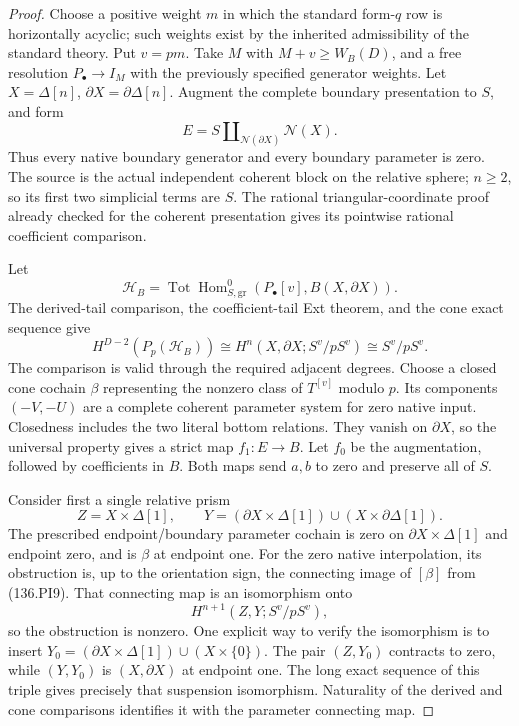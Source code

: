 \begin{proof}
Choose a positive weight \(m\) in which the standard form-\(q\)
row is horizontally acyclic; such weights exist by the inherited
admissibility of the standard theory.  Put \(v=pm\).
Take \(M\) with \(M+v\geq W_B(D)\), and a free resolution
\(P_\bullet\to I_M\) with the previously specified generator
weights.  Let \(X=\Delta[n]\), \(\partial X=\partial\Delta[n]\).
Augment the complete boundary presentation to \(S\), and form
\[
                  E=S\amalg_{\mathcal N(\partial X)}
                                             \mathcal N(X).
                                                               \tag{136.PI8}
\]
Thus every native boundary generator and every boundary parameter
is zero.  The source is the actual independent coherent block
on the relative sphere; \(n\geq2\), so its first two simplicial
terms are \(S\).  The rational triangular-coordinate proof
already checked for the coherent presentation gives its pointwise
rational coefficient comparison.

Let
\[
 \mathcal H_B=\operatorname{Tot}
       \operatorname{Hom}^{0}_{S,\mathrm{gr}}
                    (P_\bullet[v],B(X,\partial X)).
\]
The derived-tail comparison, the coefficient-tail Ext theorem,
and the cone exact sequence give
\[
 H^{D-2}(P_p(\mathcal H_B))
       \cong H^n(X,\partial X;S^v/pS^v)
       \cong S^v/pS^v.
                                                               \tag{136.PI9}
\]
The comparison is valid through the required adjacent degrees.
Choose a closed cone cochain \(\beta\) representing the
nonzero class of \(T^{[v]}\) modulo \(p\).  Its components
\((-V,-U)\) are a complete coherent parameter system for zero
native input.  Closedness includes the two literal bottom
relations.  They vanish on \(\partial X\), so the universal
property gives a strict map \(f_1:E\to B\).  Let \(f_0\)
be the augmentation, followed by coefficients in \(B\).
Both maps send \(a,b\) to zero and preserve all of \(S\).

Consider first a single relative prism
\[
 Z=X\times\Delta[1],\qquad
 Y=(\partial X\times\Delta[1])\cup(X\times\partial\Delta[1]).
\]
The prescribed endpoint/boundary parameter cochain is zero on
\(\partial X\times\Delta[1]\) and endpoint zero, and is
\(\beta\) at endpoint one.  For the zero native interpolation,
its obstruction is, up to the orientation sign, the connecting
image of \([\beta]\) from (136.PI9).  That connecting map is
an isomorphism onto
\[
                       H^{n+1}(Z,Y;S^v/pS^v),
                                                               \tag{136.PI10}
\]
so the obstruction is nonzero.  One explicit way to verify the
isomorphism is to insert
\(Y_0=(\partial X\times\Delta[1])\cup(X\times\{0\})\).
The pair \((Z,Y_0)\) contracts to zero, while
\((Y,Y_0)\) is \((X,\partial X)\) at endpoint one.
The long exact sequence of this triple gives precisely that
suspension isomorphism.  Naturality of the derived and cone
comparisons identifies it with the parameter connecting map.


\end{proof}
